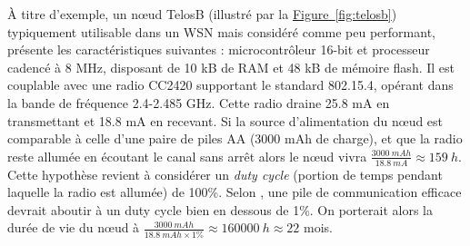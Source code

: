 \documentclass[]{report}
\newcommand{\wordlink}[2]{\hyperref[#2]{#1~\ref{#2}}}
\begin{document}
À titre d'exemple, un nœud TelosB (illustré par la \wordlink{Figure}{fig:telosb}) typiquement utilisable dans un WSN mais considéré comme peu performant, présente les caractéristiques suivantes : microcontrôleur 16-bit et processeur cadencé à 8 MHz, disposant de 10 kB de RAM et 48 kB de mémoire flash. Il est couplable avec une radio CC2420 supportant le standard 802.15.4, opérant dans la bande de fréquence 2.4-2.485 GHz. Cette radio draine 25.8 mA en transmettant et 18.8 mA en recevant. Si la source d'alimentation du nœud est comparable à celle d'une paire de piles AA (3000 mAh de charge), et que la radio reste allumée en écoutant le canal sans arrêt alors le nœud vivra $\frac{3000\: mAh}{18.8\: mA} \approx 159\: h$. Cette hypothèse revient à considérer un \textit{duty cycle} (portion de temps pendant laquelle la radio est allumée) de 100\%. Selon \cite{stack-IoT}, une pile de communication efficace devrait aboutir à un duty cycle bien en dessous de 1\%. On porterait alors la durée de vie du nœud à $\frac{3000\:mAh}{18.8\: mAh \times 1\%} \approx 160000\:h \approx 22 $ mois.\\

\newpage
\end{document}
